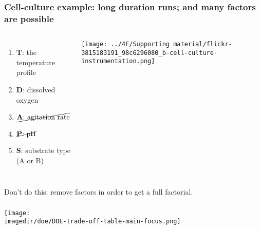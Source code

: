 \documentclass[handout,11pt,aspectratio=169,mathserif]{beamer}
\begin{document}
\begin{frame}\frametitle{Cell-culture example: long duration runs; and many factors are possible}
	\begin{columns}[c]
			\begin{enumerate}
				\item	\textbf{T}: the temperature profile
				\item	\textbf{D}: dissolved oxygen
				\item	$\cancel{\text{\textbf{A}: agitation rate}}$
				\item	$\cancel{\text{\textbf{P}: pH}}$
				\item	\textbf{S}: substrate type (A or B)
			\end{enumerate}
		
			
			\vspace{0.2cm}
			
			\centerline{\texttt{[image: ../4F/Supporting material/flickr-3815183191\_98c6296080\_b-cell-culture-instrumentation.png]}}
	\end{columns}

	\vfill
	{\color{red} Don't do this:} remove factors in order to get a full factorial.
	
\end{frame}

\begin{frame}\frametitle{}
	\centerline{\texttt{[image: \\imagedir/doe/DOE-trade-off-table-main-focus.png]}}
\end{frame}
\end{document}
